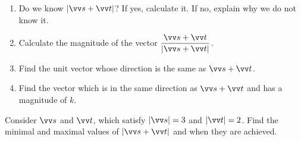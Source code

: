 \documentclass[11pt,pdfa,lastpage]{MishoNote}
\begin{document}
\begin{problems}
 \begin{enumerate}
   \item Do we know $|\vc s+\vc t|$? If yes, calculate it. If no, explain why we do not know it.
   \item Calculate the magnitude of the vector $\dfrac{\vc s+\vc t}{|\vc s+\vc t|}$.
   \item Find the unit vector whose direction is the same as $\vc s+\vc t$.
   \item Find the vector which is in the same direction as $\vc s+\vc t$ and has a magnitude of $k$.
 \end{enumerate}
\Problem[B] Consider $\vc s$ and $\vc t$, which satisfy $|\vc s|=3$ and $|\vc t|=2$. Find the minimal and maximal values of $|\vc s+\vc t|$ and when they are achieved.
\end{problems}

\newpage
\end{document}
